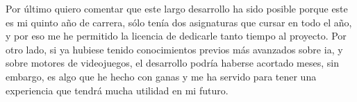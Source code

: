 Por último quiero comentar que este largo desarrollo ha sido posible porque este es mi quinto año de carrera, sólo tenía dos asignaturas que cursar en todo el año, y por eso me he permitido la licencia de dedicarle tanto tiempo al proyecto. Por otro lado, si ya hubiese tenido conocimientos previos más avanzados sobre \gls{ia}, y sobre motores de videojuegos, el desarrollo podría haberse acortado meses, sin embargo, es algo que he hecho con ganas y me ha servido para tener una experiencia que tendrá mucha utilidad en mi futuro.